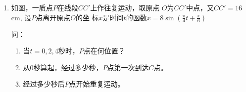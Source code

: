 \begin{enumerate}
\item 如图，一质点$P$在线段$CC'$上作往复运动，取原点
$O$为$CC'$中点，又$CC'=16$cm, 设$P$点离开原点$O$的坐
标$x$是时间$t$的函数$x=8\sin\left(\frac{\pi}{4}t+\frac{\pi}{6}\right)$
\begin{center}
\end{center}
问： \begin{enumerate}
\item 当$t=0, 2, 4$秒时，$P$点在何位置？
\item 从0秒算起，经过多少秒，$P$点第一次到达$C$点。
\item 经过多少秒后$P$点开始重复运动。
\end{enumerate}


\end{enumerate}
